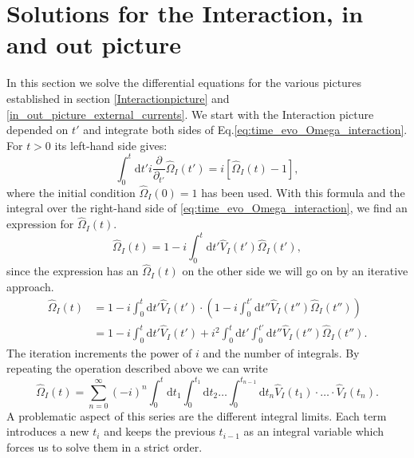 \documentclass[
12pt, %
english, %
singlespacing, %
headsepline, %
]{MastersDoctoralThesis} %
\begin{document}
\section{Solutions for the Interaction, $ \pmb{in} $  and $ \pmb{out} $ picture}\label{solutions_interaction_in_out}
In this section we solve the differential equations for the various pictures established in section \ref{Interactionpicture} and \ref{in_out_picture_external_currents}.
We start with the Interaction picture depended on $ t' $  and integrate both sides of Eq.\enskip\eqref{eq:time_evo_Omega_interaction}. For $ t>0 $ its left-hand side gives:
\begin{equation}\label{first_term_left_Omega_time_order}
\int_{0}^{t}\mathrm{d}t'
 i 
 \frac{\partial}{\partial_{t'}} 
 \hat{\Omega}_{I} (t')
 =
 i
 \left[ 
\hat{\Omega}_{I}(t) -1
 \right] 
 ,
\end{equation}
where the initial condition $ \hat{\Omega}_{I}(0)=1 $ has been used.
With this formula and the integral over the right-hand side of \eqref{eq:time_evo_Omega_interaction}, we find an expression for $ \hat{\Omega}_{I}(t) $.
\begin{equation}
\hat{\Omega}_{I}(t)=
1
-
i
\int_{0}^{t}\mathrm{d}t'\hat{V}_{I}(t')\hat{\Omega}_{I}(t')	,
\end{equation}
since the expression has an $ \hat{\Omega}_{I}(t) $ on the other side we will go on by an iterative approach.
\begin{equation}\label{Omega_first_terms}
\begin{split}
\hat{\Omega}_{I}(t)
&=
1
-
i 
\int_{0}^{t}\mathrm{d}t'\hat{V}_{I}(t')
\cdot
\left( 
1
-
i
\int_{0}^{t'}\mathrm{d}t''\hat{V}_{I}(t'')\hat{\Omega}_{I}(t'')
\right) 
\\
&=
1
-
i
\int_{0}^{t}\mathrm{d}t'\hat{V}_{I}(t')
+i^{2} 
\int_{0}^{t}\mathrm{d}t'
\int_{0}^{t'}\mathrm{d}t''
\hat{V}_{I}(t'')\hat{\Omega}_{I}(t'')
.
\end{split}
\end{equation}
The iteration increments the power of $ i $ and the number of integrals. By repeating the operation described above we can write
\begin{equation}\label{Omega_different_t}
\hat{\Omega}_{I}(t) =
\sum\limits_{n=0}^{\infty} 
(-i)^{n}
\int_{0}^{t}\mathrm{d}t_1\int_{0}^{t_{1}}\! \! \mathrm{d}t_2
 \ldots
 \int_{0}^{t_{n-1}}\! \! \mathrm{d}t_n
  \hat{V}_{I}(t_1)\cdot \ldots \cdot \hat{V}_{I}(t_n)
  .
\end{equation}
A problematic aspect of this series are the different integral limits. Each term introduces a new $ t_{i} $ and keeps the previous $ t_{i-1} $ as an integral variable which forces us to solve them in a strict order. 
\end{document}
